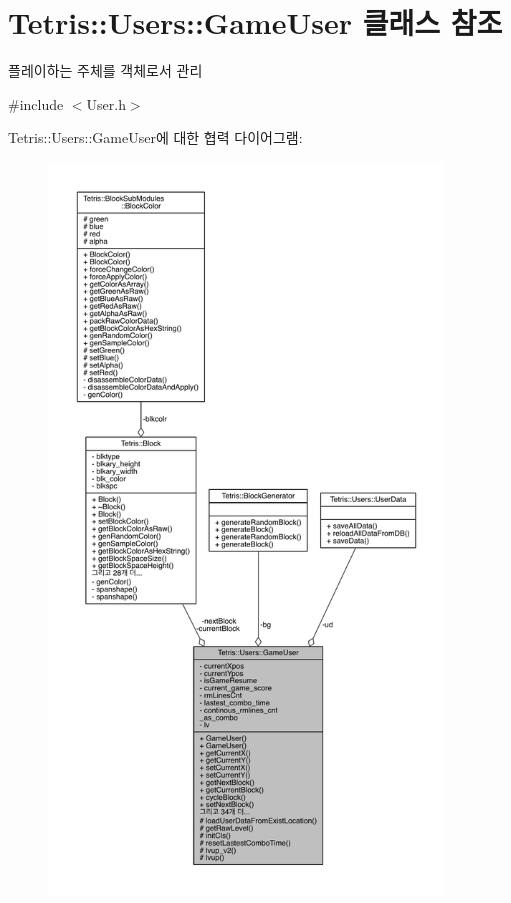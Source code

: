 \hypertarget{class_tetris_1_1_users_1_1_game_user}{}\section{Tetris\+:\+:Users\+:\+:Game\+User 클래스 참조}
\label{class_tetris_1_1_users_1_1_game_user}


플레이하는 주체를 객체로서 관리  




{\ttfamily \#include $<$User.\+h$>$}



Tetris\+:\+:Users\+:\+:Game\+User에 대한 협력 다이어그램\+:
\nopagebreak
\begin{figure}[H]
\begin{center}
\leavevmode
\includegraphics[height=550pt]{da/dd1/class_tetris_1_1_users_1_1_game_user__coll__graph}
\end{center}
\end{figure}
